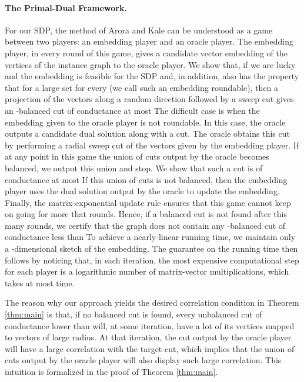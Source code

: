 \documentclass[twoside,leqno,twocolumn]{article}
\newcommand{\SDP}{{\sf SDP}\xspace}
\numberwithin{equation}{section}
\begin{document}
\paragraph{The Primal-Dual Framework.}
For our {\SDP}, the method of Arora and Kale can be understood as a game between two players: an embedding player and an  oracle player. The embedding player, in every round of this game, gives a candidate vector embedding of the vertices of the instance graph to the oracle player. We show that, if we are lucky and  the embedding is feasible for the {\SDP} and, in addition, also has the property that for a large set  for every    (we call such an embedding roundable), then a projection of the vectors along a random direction followed by a  sweep cut  gives an -balanced cut of conductance at most  The  difficult case is when the embedding given to the oracle player is not roundable. In this case, the oracle outputs a candidate dual solution along with a cut. The oracle obtains this  cut  by performing a radial sweep cut of the vectors given by the embedding player.  If at any point in this game the union of cuts output by the oracle becomes balanced, we output this union and stop. We show that such a cut is of conductance at most   If this union of cuts is not balanced, then the embedding player uses the dual solution output by the oracle to update the embedding.
Finally, the matrix-exponential update rule ensures that this game cannot keep on going  for more that  rounds. Hence, if a balanced cut is not found after this many rounds, we certify that the graph does not contain any -balanced cut of conductance less than   
To achieve a nearly-linear running time, we  maintain only  a -dimensional sketch of the embedding.  The guarantee on the running time then follows by noticing that,  in each iteration,  the most expensive computational step for each player is a logarithmic number of matrix-vector multiplications, which takes at most  time. 

The reason why our approach yields the desired correlation condition in Theorem \ref{thm:main} is that, if no balanced cut is found, every unbalanced cut of conductance lower than  will, at some iteration, have a lot of its vertices mapped to vectors of large radius. At that iteration, the cut output by the oracle player will have a large correlation with the target cut, which implies that the union of cuts output by the oracle player will also display such large correlation. This intuition is formalized in the proof of Theorem \ref{thm:main}.
\end{document}
